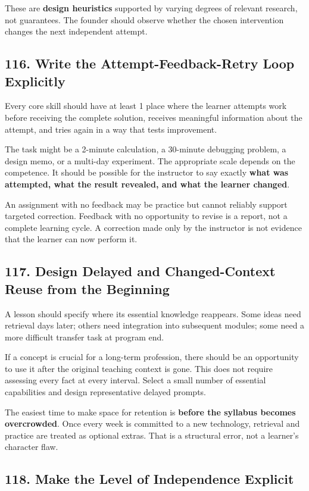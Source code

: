 These are \textbf{design heuristics} supported by varying degrees of relevant research, not guarantees. The founder should observe whether the chosen intervention changes the next independent attempt.

\subsection*{116. Write the Attempt-Feedback-Retry Loop Explicitly}

Every core skill should have at least 1 place where the learner attempts work before receiving the complete solution, receives meaningful information about the attempt, and tries again in a way that tests improvement.

The task might be a 2-minute calculation, a 30-minute debugging problem, a design memo, or a multi-day experiment. The appropriate scale depends on the competence. It should be possible for the instructor to say exactly \textbf{what was attempted, what the result revealed, and what the learner changed}.

An assignment with no feedback may be practice but cannot reliably support targeted correction. Feedback with no opportunity to revise is a report, not a complete learning cycle. A correction made only by the instructor is not evidence that the learner can now perform it.

\subsection*{117. Design Delayed and Changed-Context Reuse from the Beginning}

A lesson should specify where its essential knowledge reappears. Some ideas need retrieval days later; others need integration into subsequent modules; some need a more difficult transfer task at program end.

If a concept is crucial for a long-term profession, there should be an opportunity to use it after the original teaching context is gone. This does not require assessing every fact at every interval. Select a small number of essential capabilities and design representative delayed prompts.

The easiest time to make space for retention is \textbf{before the syllabus becomes overcrowded}. Once every week is committed to a new technology, retrieval and practice are treated as optional extras. That is a structural error, not a learner's character flaw.

\subsection*{118. Make the Level of Independence Explicit}

